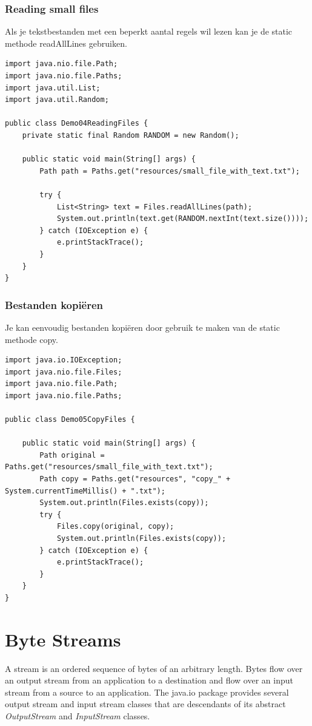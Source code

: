 \subsubsection{Reading small files}

Als je tekstbestanden met een beperkt aantal regels wil lezen kan je de static methode readAllLines gebruiken.

\begin{lstlisting}
import java.nio.file.Path;
import java.nio.file.Paths;
import java.util.List;
import java.util.Random;

public class Demo04ReadingFiles {
	private static final Random RANDOM = new Random();

	public static void main(String[] args) {
		Path path = Paths.get("resources/small_file_with_text.txt");

		try {
			List<String> text = Files.readAllLines(path);
			System.out.println(text.get(RANDOM.nextInt(text.size())));
		} catch (IOException e) {
			e.printStackTrace();
		}
	}
}
\end{lstlisting}

\subsubsection{Bestanden kopi\"eren}

Je kan eenvoudig bestanden kopi\"eren door gebruik te maken van de static methode copy.

\begin{lstlisting}
import java.io.IOException;
import java.nio.file.Files;
import java.nio.file.Path;
import java.nio.file.Paths;

public class Demo05CopyFiles {

	public static void main(String[] args) {
		Path original = Paths.get("resources/small_file_with_text.txt");
		Path copy = Paths.get("resources", "copy_" + System.currentTimeMillis() + ".txt");
		System.out.println(Files.exists(copy));
		try {
			Files.copy(original, copy);
			System.out.println(Files.exists(copy));
		} catch (IOException e) {
			e.printStackTrace();
		}
	}
}
\end{lstlisting}


\section{Byte Streams}


A stream is an ordered sequence of bytes of an arbitrary length.  Bytes flow over an output stream from an application to a destination and flow over an input stream from a source to an application.
The java.io package provides several output stream and input stream classes that are descendants of its abstract \textit{OutputStream} and \textit{InputStream} classes.


